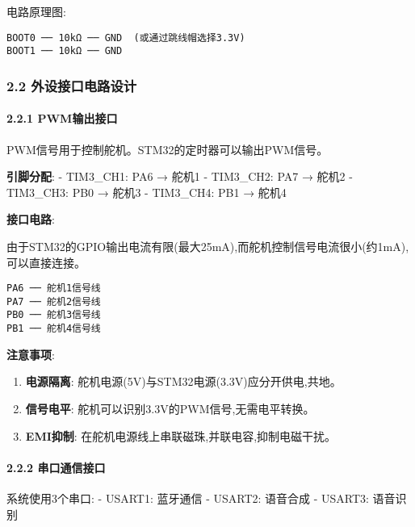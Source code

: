 \documentclass[
]{article}
\begin{document}
电路原理图:

\begin{verbatim}
BOOT0 ── 10kΩ ── GND  (或通过跳线帽选择3.3V)
BOOT1 ── 10kΩ ── GND
\end{verbatim}

\hypertarget{ux5916ux8bbeux63a5ux53e3ux7535ux8defux8bbeux8ba1}{%
\subsubsection{2.2
外设接口电路设计}\label{ux5916ux8bbeux63a5ux53e3ux7535ux8defux8bbeux8ba1}}

\hypertarget{pwmux8f93ux51faux63a5ux53e3}{%
\paragraph{2.2.1 PWM输出接口}\label{pwmux8f93ux51faux63a5ux53e3}}

PWM信号用于控制舵机。STM32的定时器可以输出PWM信号。

\textbf{引脚分配}: - TIM3\_CH1: PA6 → 舵机1 - TIM3\_CH2: PA7 → 舵机2 -
TIM3\_CH3: PB0 → 舵机3 - TIM3\_CH4: PB1 → 舵机4

\textbf{接口电路}:

由于STM32的GPIO输出电流有限(最大25mA),而舵机控制信号电流很小(约1mA),可以直接连接。

\begin{verbatim}
PA6 ── 舵机1信号线
PA7 ── 舵机2信号线
PB0 ── 舵机3信号线
PB1 ── 舵机4信号线
\end{verbatim}

\textbf{注意事项}:

\begin{enumerate}
\def\labelenumi{\arabic{enumi}.}
\item
  \textbf{电源隔离}: 舵机电源(5V)与STM32电源(3.3V)应分开供电,共地。
\item
  \textbf{信号电平}: 舵机可以识别3.3V的PWM信号,无需电平转换。
\item
  \textbf{EMI抑制}: 在舵机电源线上串联磁珠,并联电容,抑制电磁干扰。
\end{enumerate}

\hypertarget{ux4e32ux53e3ux901aux4fe1ux63a5ux53e3}{%
\paragraph{2.2.2
串口通信接口}\label{ux4e32ux53e3ux901aux4fe1ux63a5ux53e3}}

系统使用3个串口: - USART1: 蓝牙通信 - USART2: 语音合成 - USART3:
语音识别
\end{document}
